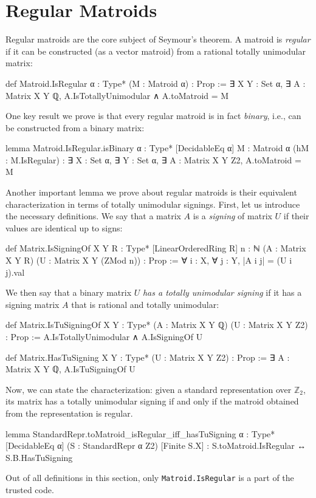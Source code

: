 \section{Regular Matroids}\label{sec:regular_matroid}

Regular matroids \cite{Oxley2011,Truemper2016} are the core subject of Seymour's theorem. A matroid is \emph{regular} if it can be constructed (as a vector matroid) from a rational totally unimodular matrix:
\begin{leancode}
def Matroid.IsRegular {α : Type*}
    (M : Matroid α) : Prop :=
  ∃ X Y : Set α, ∃ A : Matrix X Y ℚ, 
    A.IsTotallyUnimodular ∧ A.toMatroid = M
\end{leancode}
One key result we prove is that every regular matroid is in fact \emph{binary}, i.e., can be constructed from a binary matrix:
\begin{leancode}
lemma Matroid.IsRegular.isBinary
    {α : Type*} [DecidableEq α]
    {M : Matroid α} (hM : M.IsRegular) :
  ∃ X : Set α, ∃ Y : Set α, ∃ A : Matrix X Y Z2, 
    A.toMatroid = M
\end{leancode}
Another important lemma we prove about regular matroids is their equivalent characterization in terms of totally unimodular signings. First, let us introduce the necessary definitions. We say that a matrix $A$ is a \emph{signing} of matrix $U$ if their values are identical up to signs:
\begin{leancode}
def Matrix.IsSigningOf {X Y R : Type*}
    [LinearOrderedRing R] {n : ℕ}
    (A : Matrix X Y R) (U : Matrix X Y (ZMod n)) :
    Prop :=
  ∀ i : X, ∀ j : Y, |A i j| = (U i j).val
\end{leancode}
We then say that a binary matrix $U$ \emph{has a totally unimodular signing} if it has a signing matrix $A$ that is rational and totally unimodular:
\begin{leancode}
def Matrix.IsTuSigningOf {X Y : Type*} 
    (A : Matrix X Y ℚ) (U : Matrix X Y Z2) :
    Prop :=
  A.IsTotallyUnimodular ∧ A.IsSigningOf U
\end{leancode}
\begin{leancode}
def Matrix.HasTuSigning {X Y : Type*} 
    (U : Matrix X Y Z2) : Prop :=
  ∃ A : Matrix X Y ℚ, A.IsTuSigningOf U
\end{leancode}
Now, we can state the characterization: given a standard representation over $\mathbb{Z}_{2}$, its matrix has a totally unimodular signing if and only if the matroid obtained from the representation is regular.
\begin{leancode}
lemma
StandardRepr.toMatroid_isRegular_iff_hasTuSigning
    {α : Type*} [DecidableEq α]
    (S : StandardRepr α Z2) [Finite S.X] :
  S.toMatroid.IsRegular ↔ S.B.HasTuSigning
\end{leancode} 
Out of all definitions in this section, only \texttt{Matroid.IsRegular} is a part of the trusted code.
